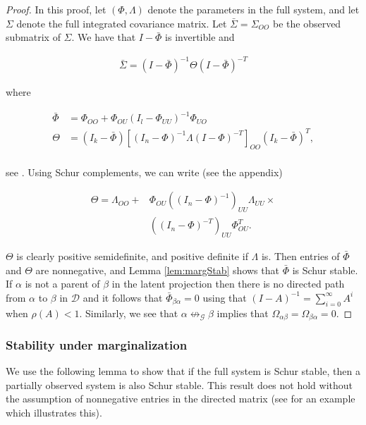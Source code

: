 \documentclass[accepted]{uai2021} %
\begin{document}
	\begin{proof}
		In this proof, let $(\Phi, \Lambda)$ denote the parameters in the full 
		system, and let $\Sigma$ denote the full integrated covariance matrix. 
		Let $\bar{\Sigma} = \Sigma_{OO}$ be 
		the observed submatrix of $\Sigma$. We 
		have 
		that $I - \bar{\Phi}$ is invertible and
		
		\begin{align}
		\bar{\Sigma} = (I - \bar{\Phi})^{-1}\Theta(I - \bar{\Phi})^{-T}
		\end{align}
		
		where 
		
		\begin{align*}
		\bar{\Phi} & = {\Phi}_{OO} +  {\Phi}_{OU}(I_l - 
		{\Phi}_{UU})^{-1}{\Phi}_{UO} \\
		\Theta & = (I_k-\bar{\Phi})[(I_n - {\Phi})^{-1}{\Lambda}(I - 
		{\Phi})^{-T}]_{OO}(I_k-\bar{\Phi})^T, \\
		\end{align*}
		
		see \citep{hyttinen2012}. Using Schur complements, we can write (see 
		the 
		appendix)
		
		\begin{align*}
		\Theta =  {\Lambda}_{OO} + & {\Phi}_{OU}((I_n - 
		{\Phi})^{-1})_{UU}{\Lambda}_{UU} \times  \\ & ((I_n - 
		{\Phi})^{-T})_{UU}
		{\Phi}_{OU}^T.
		\end{align*}
		
		$\Theta$ is clearly positive semidefinite, and positive definite if 
		$\Lambda$ is. Then entries of $\bar{\Phi}$ and $\Theta$ are 
		nonnegative, and Lemma \ref{lem:margStab} shows that $\bar{\Phi}$ is 
		Schur stable. If $\alpha$ is not a parent of 
		$\beta$ in the latent projection then there is no directed path from 
		$\alpha$ to $\beta$ in $\mathcal{D}$ and it follows that 
		$\bar{\Phi}_{\beta\alpha} = 0$ using that $(I-A)^{-1} = 
		\sum_{i=0}^\infty 
		A^i$ when $\rho(A) < 1$. Similarly, we see that 
		$\alpha\not\leftrightarrow_\mathcal{G}\beta$ implies that 
		$\Omega_{\alpha\beta} = \Omega_{\beta\alpha} = 0$. 
		
		
	\end{proof}


\subsubsection{Stability under marginalization}

We use the following lemma to show that if the full system is Schur stable, 
then a 
partially observed system is also Schur stable. This result does not hold 
without the assumption of nonnegative entries in the directed matrix (see 
\cite{hyttinen2012} for an example which illustrates this).
\end{document}
